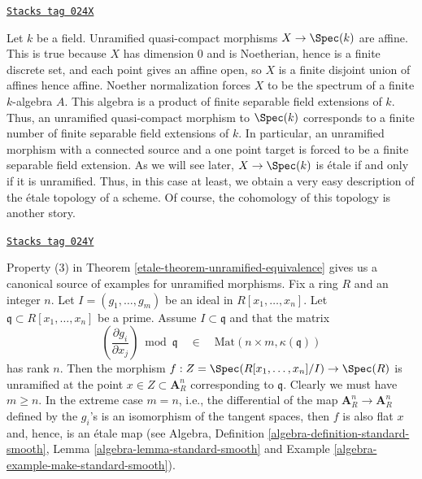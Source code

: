 \begin{example}
\label{etale-example-etale-field-extensions}
\href{https://stacks.math.columbia.edu/tag/024X}{\texttt{Stacks tag 024X}}

Let $k$ be a field.
Unramified quasi-compact morphisms $X \to \Spec(k)$ are affine.
This is true because $X$ has dimension $0$ and is Noetherian,
hence is a finite discrete set, and each point gives an affine open,
so $X$ is a finite disjoint union of affines hence affine.
Noether normalization forces $X$ to be the spectrum of a finite
$k$-algebra $A$.
This algebra is a product of finite separable field extensions of $k$.
Thus, an unramified quasi-compact morphism to $\Spec(k)$
corresponds to a finite number of finite separable field extensions of $k$.
In particular, an unramified morphism with a connected source and a one point
target is forced to be a finite separable field extension.
As we will see later, $X \to \Spec(k)$ is \'etale if and
only if it is unramified. Thus, in this case at least, we obtain a very easy
description of the \'etale topology of a scheme. Of course, the cohomology of
this topology is another story.
\end{example}

\begin{example}
\label{etale-example-standard-etale}
\href{https://stacks.math.columbia.edu/tag/024Y}{\texttt{Stacks tag 024Y}}

Property (3) in
Theorem \ref{etale-theorem-unramified-equivalence}
gives us a canonical source of examples for unramified morphisms.
Fix a ring $R$ and an integer $n$. Let $I = (g_1, \ldots, g_m)$ be an
ideal in $R[x_1, \ldots, x_n]$. Let $\mathfrak q \subset R[x_1, \ldots, x_n]$
be a prime. Assume $I \subset \mathfrak q$ and that the matrix
$$
\left(\frac{\partial g_i}{\partial x_j}\right) \bmod \mathfrak q
\quad\in\quad
\text{Mat}(n \times m, \kappa(\mathfrak q))
$$
has rank $n$. Then the morphism
$f : Z = \Spec(R[x_1, \ldots, x_n]/I) \to \Spec(R)$
is unramified at the point $x \in Z \subset \mathbf{A}^n_R$ corresponding
to $\mathfrak q$. Clearly we must have $m \geq n$.
In the extreme case $m = n$, i.e., the differential of the map
$\mathbf{A}^n_R \to \mathbf{A}^n_R$ defined by the $g_i$'s
is an isomorphism of the tangent spaces, then $f$ is also flat
$x$ and, hence, is an \'etale map (see Algebra,
Definition \ref{algebra-definition-standard-smooth},
Lemma \ref{algebra-lemma-standard-smooth} and
Example \ref{algebra-example-make-standard-smooth}).
\end{example}

